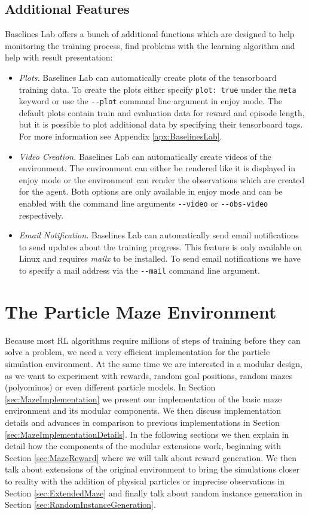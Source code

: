 \subsection{Additional Features} \label{sec:blAdvanced}
Baselines Lab offers a bunch of additional functions which are designed to help monitoring the training process, find problems with the learning algorithm and help with result presentation:

\begin{itemize}
    \item \textit{Plots.} Baselines Lab can automatically create plots of the tensorboard training data. To create the plots either specify \texttt{plot: true} under the \texttt{meta} keyword or use the \texttt{-{}-plot} command line argument in enjoy mode. The default plots contain train and evaluation data for reward and episode length, but it is possible to plot additional data by specifying their tensorboard tags. For more information see Appendix \ref{apx:BaselinesLab}.
    \item \textit{Video Creation.} Baselines Lab can automatically create videos of  the environment. The environment can either be rendered like it is displayed in enjoy mode or the environment can render the observations which are created for the agent. Both options are only available in enjoy mode and can be enabled with the command line arguments \texttt{-{}-video} or \texttt{-{}-obs-video} respectively.
    \item \textit{Email Notification.} Baselines Lab can automatically send email notifications to send updates about the training progress. This feature is only available on Linux and requires \textit{mailx} to be installed. To send email notifications we have to specify a mail address via the \texttt{-{}-mail} command line argument. 
\end{itemize}

\section{The Particle Maze Environment} \label{sec:MazeEnvironment}
Because most RL algorithms require millions of steps of training before they can solve a problem, we need a very efficient implementation for the particle simulation environment. At the same time we are interested in a modular design, as we want to experiment with rewards, random goal positions, random mazes (polyominos) or even different particle models. In Section \ref{sec:MazeImplementation} we present our implementation of the basic maze environment and its modular components. We then discuss implementation details and advances in comparison to previous implementations in Section \ref{sec:MazeImplementationDetails}. In the following sections we then explain in detail how the components of the modular extensions work, beginning with Section \ref{sec:MazeReward} where we will talk about reward generation. We then talk about extensions of the original environment to bring the simulations closer to reality with the addition of physical particles or imprecise observations in Section \ref{sec:ExtendedMaze} and finally talk about random instance generation in Section \ref{sec:RandomInstanceGeneration}.


